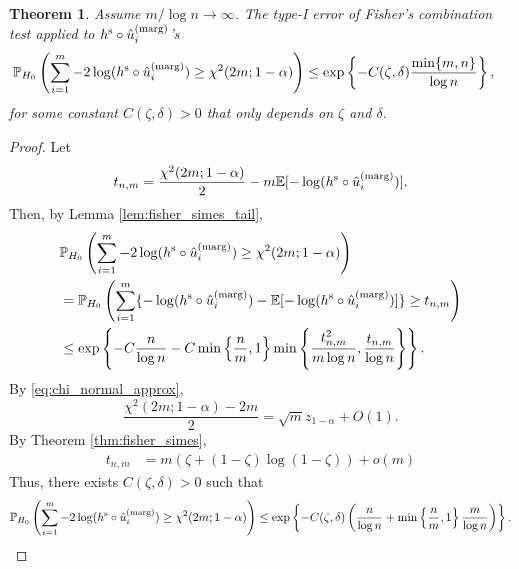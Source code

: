 \documentclass[11pt]{article}
\newtheorem{thm}{Theorem}
\def\E{\mathbb{E}}
\def\marg{\textnormal{(marg)}}
\def\simes{\textnormal{s}}
\renewcommand{\P}{\mathbb{P}}
\newcommand{\lb}{\left(}
\newcommand{\rb}{\right)}
\begin{document}
\begin{thm}\label{thm:fisher_simes_effective_alpha}
  Assume $m / \log n\rightarrow \infty$. The type-I error of Fisher's combination test applied to $h^\simes\circ \hat{u}_i^\marg$'s
  \begin{align*}
    &\P_{H_0}\lb\sum_{i=1}^{m} -2\log(h^\simes \circ \hat{u}_i^\marg)\ge \chi^2(2m; 1 - \alpha)\rb \le \exp\left\{-C(\zeta, \delta)\frac{\min\{m, n\}}{\log n}\right\},
  \end{align*}
  for some constant $C(\zeta, \delta) > 0$ that only depends on $\zeta$ and $\delta$.
\end{thm}
\begin{proof}
  Let
  \[t_{n, m} = \frac{\chi^2(2m; 1 - \alpha)}{2} - m\E[-\log(h^\simes \circ \hat{u}_i^\marg)].\]
  Then, by Lemma \ref{lem:fisher_simes_tail},
  \begin{align*}
    &\P_{H_0}\lb \sum_{i=1}^{m} -2\log(h^\simes \circ \hat{u}_i^\marg)\ge \chi^2(2m; 1 - \alpha)\rb\\
    & = \P_{H_0}\lb \sum_{i=1}^{m} \{-\log(h^\simes \circ \hat{u}_i^\marg) - \E[-\log(h^\simes \circ \hat{u}_i^\marg)]\}\ge t_{n, m}\rb\\
    & \le \exp\left\{-C\frac{n}{\log n} - C\min\left\{\frac{n}{m}, 1\right\}\min\left\{\frac{t_{n,m}^2}{m\log n}, \frac{t_{n,m}}{\log n}\right\}\right\}.
  \end{align*}
  By \eqref{eq:chi_normal_approx},
  \[\frac{\chi^2(2m; 1 - \alpha) - 2m}{2} = \sqrt{m}z_{1-\alpha} + O\lb 1\rb.\]
  By Theorem \ref{thm:fisher_simes},
  \begin{align*}
    t_{n, m} &= m(\zeta + (1 - \zeta)\log(1 - \zeta)) + o(m)
  \end{align*}
  Thus, there exists $C(\zeta, \delta)> 0$ such that
  \[\P_{H_0}\lb \sum_{i=1}^{m} -2\log(h^\simes \circ \hat{u}_i^\marg)\ge \chi^2(2m; 1 - \alpha)\rb \le \exp\left\{-C(\zeta, \delta)\lb\frac{n}{\log n} + \min\left\{\frac{n}{m}, 1\right\}\frac{m}{\log n}\rb\right\}.\]
  
\end{proof}


\end{document}
